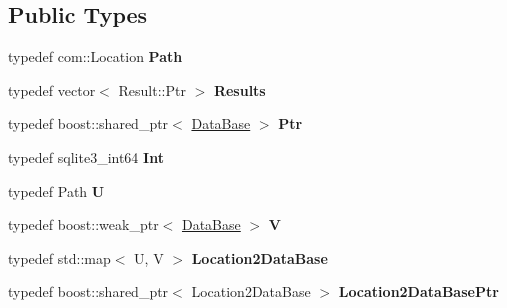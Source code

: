 \subsection*{Public Types}
\begin{DoxyCompactItemize}
\item 
\hypertarget{classsambag_1_1cpsqlite_1_1_data_base_a9b9d86a2c554e24118b75698b7433bf1}{
typedef com::Location {\bfseries Path}}
\label{classsambag_1_1cpsqlite_1_1_data_base_a9b9d86a2c554e24118b75698b7433bf1}

\item 
\hypertarget{classsambag_1_1cpsqlite_1_1_data_base_acf3c176aac578d2484b2c363fe1e04b8}{
typedef vector$<$ Result::Ptr $>$ {\bfseries Results}}
\label{classsambag_1_1cpsqlite_1_1_data_base_acf3c176aac578d2484b2c363fe1e04b8}

\item 
\hypertarget{classsambag_1_1cpsqlite_1_1_data_base_a990bbcbe46d32d41132675d370a6c70c}{
typedef boost::shared\_\-ptr$<$ \hyperlink{classsambag_1_1cpsqlite_1_1_data_base}{DataBase} $>$ {\bfseries Ptr}}
\label{classsambag_1_1cpsqlite_1_1_data_base_a990bbcbe46d32d41132675d370a6c70c}

\item 
\hypertarget{classsambag_1_1cpsqlite_1_1_data_base_a6e418b0fc75ec0c2f2a9b439d902131b}{
typedef sqlite3\_\-int64 {\bfseries Int}}
\label{classsambag_1_1cpsqlite_1_1_data_base_a6e418b0fc75ec0c2f2a9b439d902131b}

\item 
\hypertarget{classsambag_1_1cpsqlite_1_1_data_base_ac91eef73fd1d4d2a4b8176afd428c0eb}{
typedef Path {\bfseries U}}
\label{classsambag_1_1cpsqlite_1_1_data_base_ac91eef73fd1d4d2a4b8176afd428c0eb}

\item 
\hypertarget{classsambag_1_1cpsqlite_1_1_data_base_a9154fcd06acbf9bd1dbf946942e72cac}{
typedef boost::weak\_\-ptr$<$ \hyperlink{classsambag_1_1cpsqlite_1_1_data_base}{DataBase} $>$ {\bfseries V}}
\label{classsambag_1_1cpsqlite_1_1_data_base_a9154fcd06acbf9bd1dbf946942e72cac}

\item 
\hypertarget{classsambag_1_1cpsqlite_1_1_data_base_a58e6167b88257d029e97accab5ed4896}{
typedef std::map$<$ U, V $>$ {\bfseries Location2DataBase}}
\label{classsambag_1_1cpsqlite_1_1_data_base_a58e6167b88257d029e97accab5ed4896}

\item 
\hypertarget{classsambag_1_1cpsqlite_1_1_data_base_aa83c6c8b46ab4f175ad7f9e539602777}{
typedef boost::shared\_\-ptr$<$ Location2DataBase $>$ {\bfseries Location2DataBasePtr}}
\label{classsambag_1_1cpsqlite_1_1_data_base_aa83c6c8b46ab4f175ad7f9e539602777}

\end{DoxyCompactItemize}
